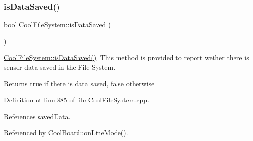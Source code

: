 \subsubsection{\texorpdfstring{is\+Data\+Saved()}{isDataSaved()}}
{\footnotesize\ttfamily bool Cool\+File\+System\+::is\+Data\+Saved (\begin{DoxyParamCaption}{ }\end{DoxyParamCaption})}

\hyperlink{classCoolFileSystem_a5a7eaeea7a9fbf8aaef651d862fa3b5b}{Cool\+File\+System\+::is\+Data\+Saved()}\+: This method is provided to report wether there is sensor data saved in the File System.

\begin{DoxyReturn}{Returns}
true if there is data saved, false otherwise 
\end{DoxyReturn}


Definition at line 885 of file Cool\+File\+System.\+cpp.



References saved\+Data.



Referenced by Cool\+Board\+::on\+Line\+Mode().


